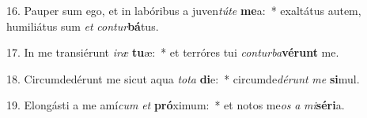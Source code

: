 16. Pauper sum ego, et in labóribus a juven\textit{tú}\textit{te} \textbf{me}a:~*  exaltátus autem, humiliátus sum \textit{et} \textit{con}\textit{tur}\textbf{bá}tus.\

17. In me transiérunt \textit{i}\textit{ræ} \textbf{tu}æ:~*  et terróres tui \textit{con}\textit{tur}\textit{ba}\textbf{vé}\textbf{runt} me.\

18. Circumdedérunt me sicut aqua \textit{to}\textit{ta} \textbf{di}e:~*  circumde\textit{dé}\textit{runt} \textit{me} \textbf{si}mul.\

19. Elongásti a me amí\textit{cum} \textit{et} \textbf{pró}ximum:~*  et notos me\textit{os} \textit{a} \textit{mi}\textbf{sé}\textbf{ri}a.\

